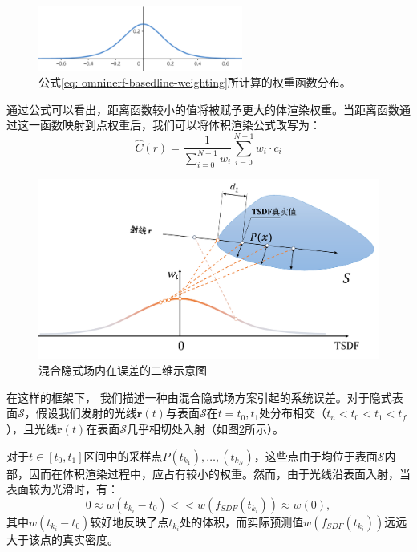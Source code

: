 \begin{figure}[ht]
    \centering
    \includegraphics[width=0.6\textwidth]{undergraduate-thesis/images/omni-nerf/neural-rgbd weighting function.png}
    \caption{公式\ref{eq: omninerf-basedline-weighting}所计算的权重函数分布。}
    \label{fig:omninerf-baseline-weighting}
\end{figure}

通过公式可以看出，距离函数较小的值将被赋予更大的体渲染权重。当距离函数通过这一函数映射到点权重后，我们可以将体积渲染公式改写为：
\begin{equation}
    \hat{C}(r) = \frac 1 {\sum_{i=0}^{N-1}w_i}\sum_{i=0}^{N-1}w_i\cdot c_i
\end{equation}

\begin{figure}[t]
    \centering
    \includegraphics[width=\textwidth]{undergraduate-thesis/images/omni-nerf/omninerf-error2.pdf}
    \caption{混合隐式场内在误差的二维示意图}
    \label{fig:omninerf-internal error}
\end{figure}

在这样的框架下， 我们描述一种由混合隐式场方案引起的系统误差。对于隐式表面$\mathcal{S}$，假设我们发射的光线$\mathbf{r}(t)$与表面$\mathcal{S}$在$t=t_0,t_1$处分布相交（$t_n<t_0<t_1<t_f$），且光线$\mathbf{r}(t)$在表面$\mathcal{S}$几乎相切处入射（如图\ref{fig:omninerf-internal error}所示）。

对于$t\in[t_0, t_1]$区间中的采样点$P(t_{k_1}), \dots, (t_{k_N})$，这些点由于均位于表面$\mathcal{S}$内部，因而在体积渲染过程中，应占有较小的权重。然而，由于光线沿表面入射，当表面较为光滑时，有：
\begin{equation}
    0\approx w(t_{k_i} - t_0) << w(f_{SDF}(t_{k_i})) \approx w(0),
\end{equation}
其中$w(t_{k_i} - t_0)$较好地反映了点$t_{k_i}$处的体积，而实际预测值$w(f_{SDF}(t_{k_i}))$远远大于该点的真实密度。

